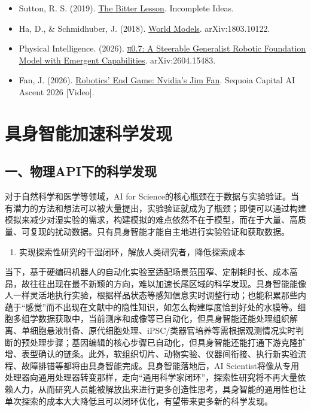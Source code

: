 \vspace{0.25em}
\begin{itemize}
\tightlist
\item
  Sutton, R. S. (2019). \href{http://www.incompleteideas.net/IncIdeas/BitterLesson.html}{The Bitter Lesson}. Incomplete Ideas.
\item
  Ha, D., \& Schmidhuber, J. (2018). \href{https://arxiv.org/abs/1803.10122}{World Models}. arXiv:1803.10122.
\item
  Physical Intelligence. (2026). \href{https://arxiv.org/abs/2604.15483}{π0.7: A Steerable Generalist Robotic Foundation Model with Emergent Capabilities}. arXiv:2604.15483.
\item
  Fan, J. (2026). \href{https://www.youtube.com/watch?v=3Y8aq_ofEVs}{Robotics' End Game: Nvidia's Jim Fan}. Sequoia Capital AI Ascent 2026 {[}Video{]}.
\end{itemize}

\clearpage

\hypertarget{ux5177ux8eabux667aux80fdux52a0ux901fux79d1ux5b66ux53d1ux73b0}{%
\section{具身智能加速科学发现}\label{ux5177ux8eabux667aux80fdux52a0ux901fux79d1ux5b66ux53d1ux73b0}}

\hypertarget{ux4e00ux7269ux7406apiux4e0bux7684ux79d1ux5b66ux53d1ux73b0}{%
\subsection{一、物理API下的科学发现}\label{ux4e00ux7269ux7406apiux4e0bux7684ux79d1ux5b66ux53d1ux73b0}}

对于自然科学和医学等领域，AI for Science的核心瓶颈在于数据与实验验证。当有潜力的方法和想法可以被大量提出，实验验证就成为了瓶颈；即便可以通过构建模拟来减少对湿实验的需求，构建模拟的难点依然不在于模型，而在于大量、高质量、可复现的扰动数据。只有具身智能才能自主地进行实验验证和获取数据。

\begin{enumerate}
\def\labelenumi{\arabic{enumi}.}
\tightlist
\item
  实现探索性研究的干湿闭环，解放人类研究者，降低探索成本
\end{enumerate}

当下，基于硬编码机器人的自动化实验室适配场景范围窄、定制耗时长、成本高昂，故往往出现在最不新颖的方向，难以加速长尾区域的科学发现。具身智能能像人一样灵活地执行实验，根据样品状态等感知信息实时调整行动；也能积累那些内蕴于``感觉''而不出现在文献中的隐性知识，如怎么构建厚度恰到好处的水膜等。细胞多组学数据获取中，当前测序和成像等已自动化，但具身智能还能处理组织解离、单细胞悬液制备、原代细胞处理、iPSC/类器官培养等需根据观测情况实时判断的预处理步骤；基因编辑的核心步骤已自动化，但具身智能还能打通下游克隆扩增、表型确认的链条。此外，软组织切片、动物实验、仪器间衔接、执行新实验流程、故障排错等都将由具身智能完成。具身智能落地后，AI Scientist将像从专用处理器向通用处理器转变那样，走向``通用科学家闭环''，探索性研究将不再大量依赖人力，从而研究人员能被解放出来进行更多创造性思考，具身智能的通用性也让单次探索的成本大大降低且可以闭环优化，有望带来更多新的科学发现。

